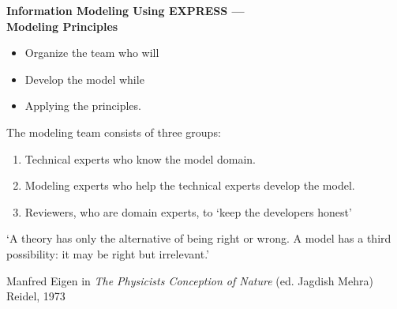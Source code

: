 

%

\pagestyle{empty}
\bodsiz

\vspace*{\beftit}
\begin{center}
{\titsiz\bfseries Information Modeling Using EXPRESS --- \\ Modeling Principles }
\end{center}
\vspace{\beftit}
\vspace{\beftit}
\begin{center}
\end{center}

\clearpage

\ifnotes
  \pagestyle{plain}
\else
  \pagestyle{empty}
\fi


\begin{itemize}
\item Organize the team who will
\item Develop the model while
\item Applying the principles.
\end{itemize}


    The modeling team consists of three groups:
\begin{enumerate}
\item Technical experts who know the model domain.
\item Modeling experts who help the technical experts develop the model.
\item Reviewers, who are domain experts, to `keep the developers honest'
\end{enumerate}


    `A theory has only the alternative of being right or wrong. A model has
a third possibility: it may be right but irrelevant.'

\begin{normalsize}
Manfred Eigen in \textit{The Physicists Conception of Nature}
(ed. Jagdish Mehra) Reidel, 1973
\end{normalsize}

